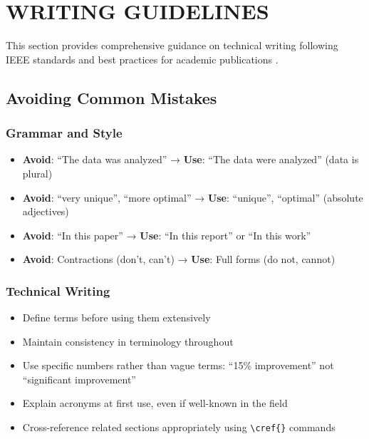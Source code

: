 \section*{WRITING GUIDELINES}

This section provides comprehensive guidance on technical writing following IEEE standards and best practices for academic publications \cite{ieee2022author, alley2018craft}.


\subsection*{Avoiding Common Mistakes}

\subsubsection*{Grammar and Style}

\begin{itemize}
    \item \textbf{Avoid}: ``The data was analyzed'' → \textbf{Use}: ``The data were analyzed'' (data is plural)
    \item \textbf{Avoid}: ``very unique'', ``more optimal'' → \textbf{Use}: ``unique'', ``optimal'' (absolute adjectives)
    \item \textbf{Avoid}: ``In this paper'' → \textbf{Use}: ``In this report'' or ``In this work''
    \item \textbf{Avoid}: Contractions (don't, can't) → \textbf{Use}: Full forms (do not, cannot)
\end{itemize}

\subsubsection*{Technical Writing}

\begin{itemize}
    \item Define terms before using them extensively
    \item Maintain consistency in terminology throughout
    \item Use specific numbers rather than vague terms: ``15\% improvement'' not ``significant improvement''
    \item Explain acronyms at first use, even if well-known in the field
    \item Cross-reference related sections appropriately using \texttt{\textbackslash cref\{\}} commands
\end{itemize}


